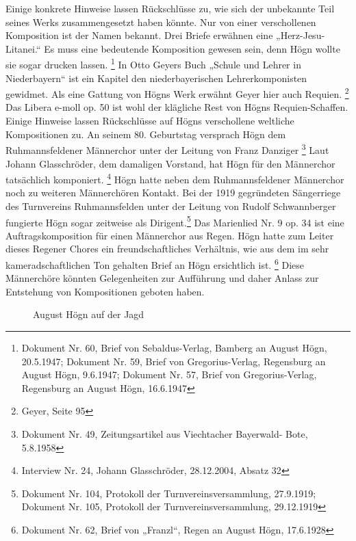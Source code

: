 Einige konkrete Hinweise lassen Rückschlüsse zu, wie sich der unbekannte
Teil seines Werks zusammengesetzt haben könnte. Nur von einer
verschollenen Komposition ist der Namen bekannt. Drei Briefe erwähnen
eine „Herz-Jesu-Litanei.“ Es muss eine bedeutende Komposition gewesen
sein, denn Högn wollte sie sogar drucken lassen.
\footnote{Dokument Nr. 60, Brief von Sebaldus-Verlag, Bamberg an August
Högn, 20.5.1947; Dokument Nr. 59, Brief von Gregorius-Verlag, Regensburg
an August Högn, 9.6.1947; Dokument Nr. 57, Brief von Gregorius-Verlag,
Regensburg an August Högn, 16.6.1947} In Otto Geyers Buch „Schule und
Lehrer in Niederbayern“ ist ein Kapitel den niederbayerischen
Lehrerkomponisten gewidmet. Als eine Gattung von Högns Werk erwähnt
Geyer hier auch Requien. \footnote{Geyer, Seite 95} Das Libera e-moll
op. 50 ist wohl der klägliche Rest von Högns Requien-Schaffen. Einige
Hinweise lassen Rückschlüsse auf Högns verschollene weltliche
Kompositionen zu. An seinem 80. Geburtstag versprach Högn dem
Ruhmannsfeldener Männerchor unter der Leitung von Franz Danziger
\footnote{Dokument Nr. 49, Zeitungsartikel aus Viechtacher Bayerwald-
Bote, 5.8.1958} Laut Johann Glasschröder, dem damaligen Vorstand, hat
Högn für den Männerchor tatsächlich komponiert. \footnote{Interview Nr.
24, Johann Glasschröder, 28.12.2004, Absatz 32} Högn hatte neben dem
Ruhmannsfeldener Männerchor noch zu weiteren Männerchören Kontakt. Bei
der 1919 gegründeten Sängerriege des Turnvereins Ruhmannsfelden unter
der Leitung von Rudolf Schwannberger fungierte Högn sogar zeitweise als
Dirigent.\footnote{ Dokument Nr. 104, Protokoll der
Turnvereinsversammlung, 27.9.1919; Dokument Nr. 105, Protokoll der
Turnvereinsversammlung, 29.12.1919} Das Marienlied Nr. 9 op. 34 ist eine
Auftragskomposition für einen Männerchor aus Regen. Högn hatte zum
Leiter dieses Regener Chores ein freundschaftliches Verhältnis, wie aus
dem im sehr kameradschaftlichen Ton gehalten Brief an Högn ersichtlich
ist. \footnote{Dokument Nr. 62, Brief von „Franzl“, Regen an August
Högn, 17.6.1928} Diese Männerchöre könnten Gelegenheiten zur Aufführung
und daher Anlass zur Entstehung von Kompositionen geboten haben.

\begin{figure}
\caption{August Högn auf der Jagd}
\end{figure}


